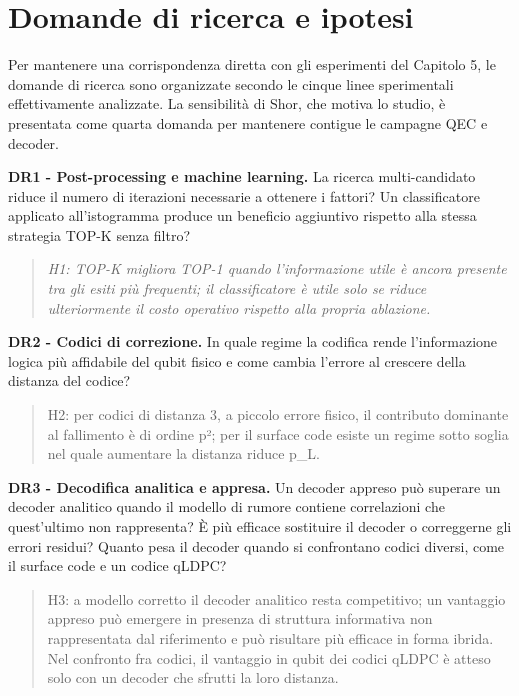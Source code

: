 \section{Domande di ricerca e ipotesi}\label{sec:finale_2_4}

Per mantenere una corrispondenza diretta con gli esperimenti del Capitolo 5, le domande di ricerca sono organizzate secondo le cinque linee sperimentali effettivamente analizzate. La sensibilità di Shor, che motiva lo studio, è presentata come quarta domanda per mantenere contigue le campagne QEC e decoder.

\textbf{DR1 - Post-processing e machine learning.} La ricerca multi-candidato riduce il numero di iterazioni necessarie a ottenere i fattori? Un classificatore applicato all'istogramma produce un beneficio aggiuntivo rispetto alla stessa strategia TOP-K senza filtro?

\begin{quote}
\emph{H1: TOP-K migliora TOP-1 quando l'informazione utile è ancora presente tra gli esiti più frequenti; il classificatore è utile solo se riduce ulteriormente il costo operativo rispetto alla propria ablazione.}
\end{quote}

\textbf{DR2 - Codici di correzione.} In quale regime la codifica rende l'informazione logica più affidabile del qubit fisico e come cambia l'errore al crescere della distanza del codice?

\begin{quote}
H2: per codici di distanza 3, a piccolo errore fisico, il contributo dominante al fallimento è di ordine p²; per il surface code esiste un regime sotto soglia nel quale aumentare la distanza riduce p\_L. \cite{steane1996,fowler2012,googleQECBelowThreshold2025,googleSurfaceCode2023,dennis2002topological}
\end{quote}

\textbf{DR3 - Decodifica analitica e appresa.} Un decoder appreso può superare un decoder analitico quando il modello di rumore contiene correlazioni che quest'ultimo non rappresenta? È più efficace sostituire il decoder o correggerne gli errori residui? Quanto pesa il decoder quando si confrontano codici diversi, come il surface code e un codice qLDPC?

\begin{quote}
H3: a modello corretto il decoder analitico resta competitivo; un vantaggio appreso può emergere in presenza di struttura informativa non rappresentata dal riferimento e può risultare più efficace in forma ibrida. Nel confronto fra codici, il vantaggio in qubit dei codici qLDPC è atteso solo con un decoder che sfrutti la loro distanza. \cite{alphaqubit2024,torlaiMelko2017,yan2026,bravyi2024}
\end{quote}

